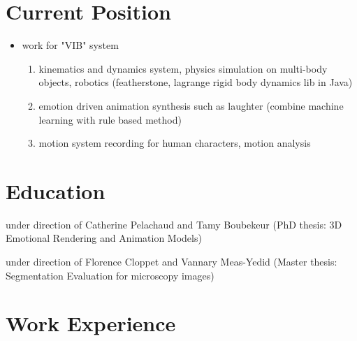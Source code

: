 \section{Current Position}
{
\begin{itemize}
	\item work for "VIB" system
	\begin{enumerate}
	\item kinematics and dynamics system, physics simulation on multi-body objects, robotics (featherstone, lagrange rigid body dynamics lib in Java)
	\item emotion driven animation synthesis such as laughter (combine machine learning with rule based method)
	\item motion system recording for human characters, motion analysis
	\end{enumerate}
\end{itemize}
}


\section{Education}
{under direction of Catherine Pelachaud and Tamy Boubekeur (PhD thesis: 3D Emotional Rendering and Animation Models)
}  %

{under direction of Florence Cloppet and Vannary Meas-Yedid (Master thesis: Segmentation Evaluation for microscopy images)
}

\section{Work Experience}

